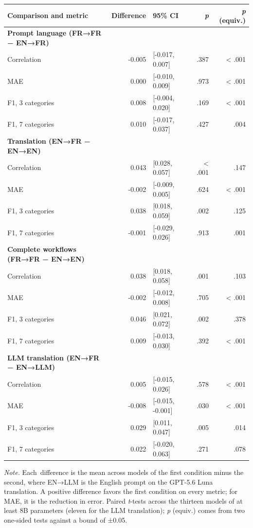 \documentclass[
  man,
  floatsintext,
  longtable,
  nolmodern,
  notxfonts,
  notimes,
  colorlinks=true,linkcolor=blue,citecolor=blue,urlcolor=blue]{apa7}
\begin{document}
\begin{table}

{\caption{{Paired Differences Between Conditions Across Models, With
Equivalence Tests}{\label{tbl-tests}}}
\vspace{-20pt}}

\begin{longtable}[]{@{}lrlrr@{}}
\toprule\noalign{}
Comparison and metric & Difference & 95\% CI & \emph{p} & \emph{p}
(equiv.) \\
\midrule\noalign{}
\endhead
\bottomrule\noalign{}
\endlastfoot
\textbf{Prompt language (FR→FR − EN→FR)} & & & & \\
Correlation & -0.005 & {[}-0.017, 0.007{]} & .387 & \textless{} .001 \\
MAE & 0.000 & {[}-0.010, 0.009{]} & .973 & \textless{} .001 \\
F1, 3 categories & 0.008 & {[}-0.004, 0.020{]} & .169 & \textless{}
.001 \\
F1, 7 categories & 0.010 & {[}-0.017, 0.037{]} & .427 & .004 \\
\textbf{Translation (EN→FR − EN→EN)} & & & & \\
Correlation & 0.043 & {[}0.028, 0.057{]} & \textless{} .001 & .147 \\
MAE & -0.002 & {[}-0.009, 0.005{]} & .624 & \textless{} .001 \\
F1, 3 categories & 0.038 & {[}0.018, 0.059{]} & .002 & .125 \\
F1, 7 categories & -0.001 & {[}-0.029, 0.026{]} & .913 & .001 \\
\textbf{Complete workflows (FR→FR − EN→EN)} & & & & \\
Correlation & 0.038 & {[}0.018, 0.058{]} & .001 & .103 \\
MAE & -0.002 & {[}-0.012, 0.008{]} & .705 & \textless{} .001 \\
F1, 3 categories & 0.046 & {[}0.021, 0.072{]} & .002 & .378 \\
F1, 7 categories & 0.009 & {[}-0.013, 0.030{]} & .392 & \textless{}
.001 \\
\textbf{LLM translation (EN→FR − EN→LLM)} & & & & \\
Correlation & 0.005 & {[}-0.015, 0.026{]} & .578 & \textless{} .001 \\
MAE & -0.008 & {[}-0.015, -0.001{]} & .030 & \textless{} .001 \\
F1, 3 categories & 0.029 & {[}0.011, 0.047{]} & .005 & .014 \\
F1, 7 categories & 0.022 & {[}-0.020, 0.063{]} & .271 & .078 \\
\end{longtable}

\vspace{-12pt}
\noindent \emph{Note.} Each~difference is the mean across models of the
first condition minus the second, where EN→LLM is the English prompt on
the GPT-5.6 Luna translation. A positive difference favors the first
condition on every metric; for MAE, it is the reduction in error. Paired
\emph{t}-tests across the thirteen models of at least 8B parameters
(eleven for the LLM translation); \emph{p} (equiv.) comes from two
one-sided tests against a bound of ±0.05.

\end{table}
\end{document}
